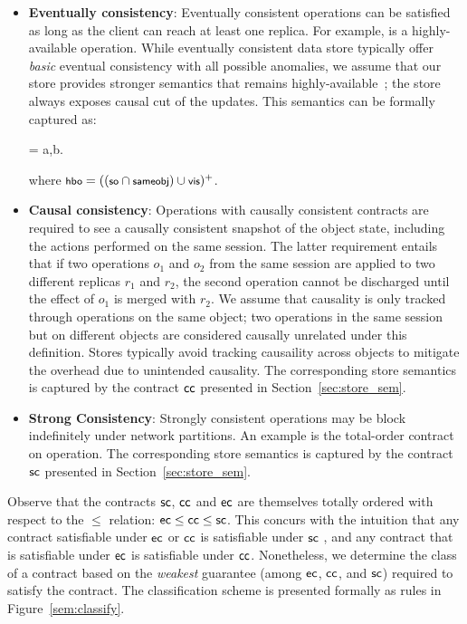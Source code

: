 \begin{itemize}
\setlength{\itemsep}{2pt}

\item \textbf{Eventually consistency}: Eventually consistent operations can be
satisfied as long as the client can reach at least one replica. For example,
 is a highly-available operation. While eventually consistent data
store typically offer \emph{basic} eventual consistency with all possible
anomalies, we assume that our store provides stronger semantics that remains
highly-available~\cite{BailisHAT,COPS}; the store always exposes causal cut of
the updates. This semantics can be formally captured as:

\vspace{-1em}
\begin{smathpar}
\ecc = \forall a,b. ~ \wedge {} \Rightarrow {}
\end{smathpar}

\noindent where $\small \hboZ = ((\soZ \cap \sameobjZ) \cup \visZ)^+$.

\item \textbf{Causal consistency}: Operations with causally consistent
contracts are required to see a causally consistent snapshot of the object
state, including the actions performed on the same session.  The latter
requirement entails that if two operations $o_1$ and $o_2$ from the same
session are applied to two different replicas $r_1$ and $r_2$, the second
operation cannot be discharged until the effect of $o_1$ is merged with $r_2$.
We assume that causality is only tracked through operations on the same object;
two operations in the same session but on different objects are considered
causally unrelated under this definition. Stores typically avoid tracking
causaility across objects to mitigate the overhead due to unintended causality.
The corresponding store semantics is captured by the contract ${\sf cc}$ presented
in Section~\ref{sec:store_sem}.

\item \textbf{Strong Consistency}: Strongly consistent operations may be block
indefinitely under network partitions. An example is the total-order contract
on  operation. The corresponding store semantics is captured by
the contract ${\sf sc}$ presented in Section~\ref{sec:store_sem}.

\end{itemize}

Observe that the contracts ${\sf sc}$, ${\sf cc}$ and ${\sf ec}$ are themselves totally
ordered with respect to the $\le$ relation: ${\sf ec} \le {\sf cc} \le {\sf sc}$. This
concurs with the intuition that any contract satisfiable under ${\sf ec}$ or ${\sf cc}$
is satisfiable under ${\sf sc}$ , and any contract that is satisfiable under ${\sf ec}$
is satisfiable under ${\sf cc}$. Nonetheless, we determine the class of a contract
based on the \emph{weakest} guarantee (among ${\sf ec}$, ${\sf cc}$, and ${\sf sc}$)
required to satisfy the contract. The classification scheme is presented
formally as rules in Figure~\ref{sem:classify}.

